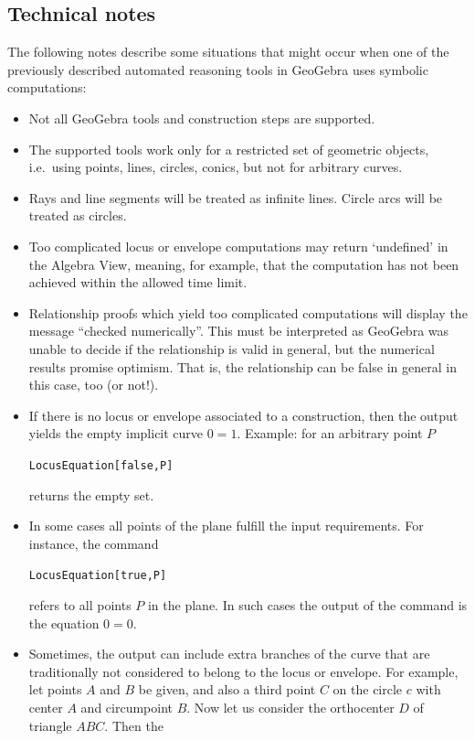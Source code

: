 \documentclass{article}
\begin{document}
\subsection{Technical notes}
\label{sec:TechnicalNotes}

The following notes describe some situations that might occur when one of the previously described automated reasoning tools in GeoGebra uses symbolic computations:
\begin{itemize}
\item Not all GeoGebra tools and construction steps are supported.
\item The supported tools work only for a restricted set of geometric objects, i.e.~using points, lines, circles, conics, but not for arbitrary curves.
\item Rays and line segments will be treated as infinite lines. Circle arcs will be treated as circles.
\item Too complicated locus or envelope computations may return `undefined' in the Algebra View, meaning, for example, that the computation has not been achieved within the allowed time limit.
\item Relationship proofs which yield too complicated computations will display the message ``checked numerically''. This must be
interpreted as GeoGebra was unable to decide if the relationship is valid in general, but the numerical results promise optimism.
That is, the relationship can be false in general in this case, too (or not!).
\item If there is no locus or envelope associated to a construction, then the output yields the empty implicit curve $0=1$. Example: for an arbitrary point $P$
\begin{center}
\texttt{LocusEquation[false,P]}
\end{center}
returns the empty set.
\item In some cases all points of the plane fulfill the input requirements. For instance, the command
\begin{center}
\texttt{LocusEquation[true,P]}
\end{center}
refers to all points $P$ in the plane. In such cases the output of the command is the equation $0=0$.
\item Sometimes, the output can include extra branches of the curve that are traditionally not considered to belong to the locus or envelope.
For example, let points $A$ and $B$ be given, and also a third point $C$ on the circle $c$ with center $A$
and circumpoint $B$. Now let us consider the orthocenter $D$ of triangle $ABC$. Then the

\end{itemize}
\end{document}
